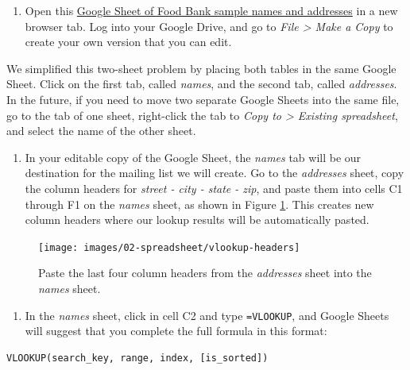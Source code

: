 \documentclass[
  english,
]{book}
\providecommand{\tightlist}{%
  \setlength{\itemsep}{0pt}\setlength{\parskip}{0pt}}
\begin{document}
\begin{enumerate}
\def\labelenumi{\arabic{enumi}.}
\tightlist
\item
  Open this \href{https://docs.google.com/spreadsheets/d/1bcvOJayycijIbf8e-u_cMq0kPbEp29MFQr_FXK6igs4}{Google Sheet of Food Bank sample names and addresses} in a new browser tab. Log into your Google Drive, and go to \emph{File \textgreater{} Make a Copy} to create your own version that you can edit.
\end{enumerate}

We simplified this two-sheet problem by placing both tables in the same Google Sheet. Click on the first tab, called \emph{names}, and the second tab, called \emph{addresses}. In the future, if you need to move two separate Google Sheets into the same file, go to the tab of one sheet, right-click the tab to \emph{Copy to \textgreater{} Existing spreadsheet}, and select the name of the other sheet.

\begin{enumerate}
\def\labelenumi{\arabic{enumi}.}
\setcounter{enumi}{1}
\tightlist
\item
  In your editable copy of the Google Sheet, the \emph{names} tab will be our destination for the mailing list we will create. Go to the \emph{addresses} sheet, copy the column headers for \emph{street - city - state - zip}, and paste them into cells C1 through F1 on the \emph{names} sheet, as shown in Figure \ref{fig:vlookup-headers}. This creates new column headers where our lookup results will be automatically pasted.
\end{enumerate}



\begin{figure}
\texttt{[image: images/02-spreadsheet/vlookup-headers]} \caption{Paste the last four column headers from the \emph{addresses} sheet into the \emph{names} sheet.}\label{fig:vlookup-headers}
\end{figure}

\begin{enumerate}
\def\labelenumi{\arabic{enumi}.}
\setcounter{enumi}{2}
\tightlist
\item
  In the \emph{names} sheet, click in cell C2 and type \texttt{=VLOOKUP}, and Google Sheets will suggest that you complete the full formula in this format:
\end{enumerate}

\begin{verbatim}
VLOOKUP(search_key, range, index, [is_sorted])
\end{verbatim}
\end{document}
